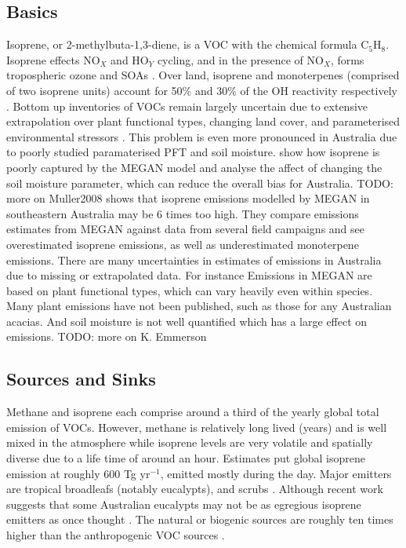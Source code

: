   \subsection{Basics}
    Isoprene, or 2-methylbuta-1,3-diene, is a VOC with the chemical formula C$_5$H$_8$. 
    Isoprene effects NO$_X$ and HO$_Y$ cycling, and in the presence of NO$_X$, forms tropospheric ozone and SOAs \citep{Wagner2002, Millet2006}.
    Over land, isoprene and monoterpenes (comprised of two isoprene units) account for 50\% and 30\% of the OH reactivity respectively \citep{Fuentes2000}.
    Bottom up inventories of VOCs remain largely uncertain due to extensive extrapolation over plant functional types, changing land cover, and parameterised environmental stressors \citep{Guenther2000,Kanikadou2005}.
    This problem is even more pronounced in Australia due to poorly studied paramaterised PFT and soil moisture.
    \cite{Muller2008} show how isoprene is poorly captured by the MEGAN model and analyse the affect of changing the soil moisture parameter, which can reduce the overall bias for Australia.
    TODO: more on Muller2008
    \cite{Emmerson2016} shows that isoprene emissions modelled by MEGAN in southeastern Australia may be 6 times too high. 
    They compare emissions estimates from MEGAN against data from several field campaigns and see overestimated isoprene emissions, as well as underestimated monoterpene emissions.
    There are many uncertainties in estimates of emissions in Australia due to missing or extrapolated data.
    For instance Emissions in MEGAN are based on plant functional types, which can vary heavily even within species.
    Many plant emissions have not been published, such as those for any Australian acacias.
    And soil moisture is not well quantified which has a large effect on emissions.
    TODO: more on K. Emmerson

  \subsection{Sources and Sinks}
    Methane and isoprene each comprise around a third of the yearly global total emission of VOCs.
    However, methane is relatively long lived (years) and is well mixed in the atmosphere while isoprene levels are very volatile and spatially diverse due to a life time of around an hour.
    Estimates put global isoprene emission at roughly 600 Tg yr$^{-1}$, emitted mostly during the day.
    Major emitters are tropical broadleafs (notably eucalypts), and scrubs \citep{Guenther2006, Arneth2008, Niinemets2010, Monks2015}.
    Although recent work suggests that some Australian eucalypts may not be as egregious isoprene emitters as once thought \citet{Emmerson2016}.
    The natural or biogenic sources are roughly ten times higher than the anthropogenic VOC sources \citep{Guenther2006, Kanakidou2005}.

